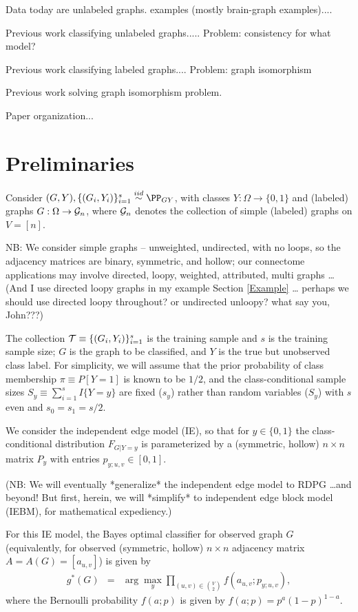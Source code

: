 Data today are unlabeled graphs.  examples (mostly brain-graph examples)....

Previous work classifying unlabeled graphs..... Problem: consistency for what model?

Previous work classifying labeled graphs.... Problem: graph isomorphism

Previous work solving graph isomorphism problem.

Paper organization...

\section{Preliminaries} %
\label{sec:preliminaries}



Consider $(G,Y),\{(G_i,Y_i)\}_{i=1}^s \overset{iid}{\sim} \PP_{GY}$,
with classes $Y:\Omega \rightarrow \{0,1\}$ and
(labeled) graphs $G:\Omega \rightarrow \mathcal{G}_n$,
where $\mathcal{G}_n$ denotes the collection of simple (labeled) graphs on $V=[n]$.

NB:
We consider simple graphs -- unweighted, undirected, with no loops,
so the adjacency matrices are binary, symmetric, and hollow;
our connectome applications
may involve {directed, loopy, weighted, attributed, multi} graphs \ldots
(And I use directed loopy graphs in my example Section \ref{Example} \dots
perhaps we should use directed loopy throughout? or undirected unloopy? what say you, John???)

The collection
$\mathcal{T} \equiv \{(G_i,Y_i)\}_{i=1}^s$ is the training sample
and $s$ is the training sample size;
$G$ is the graph to be classified,
and $Y$ is the true but unobserved class label.
For simplicity, we will assume that the prior probability of class membership
$\pi \equiv P[Y=1]$ is known to be $1/2$,
and the class-conditional sample sizes $S_y \equiv \sum_{i=1}^s I\{Y=y\}$
are fixed ($s_y$) rather than random variables ($S_y$)
with $s$ even and $s_0=s_1=s/2$.

We consider the independent edge model (IE),
so that for $y \in \{0,1\}$ the class-conditional distribution $F_{G|Y=y}$
is parameterized by a (symmetric, hollow)
$n \times n$ matrix $P_y$ with entries $p_{y;u,v} \in [0,1]$.

(NB: We will eventually *generalize* the independent edge model to RDPG \ldots and beyond!
But first, herein, we will *simplify* to independent edge block model (IEBM), for mathematical expediency.)

For this IE model, the Bayes optimal classifier for observed graph $G$
(equivalently, for observed (symmetric, hollow) $n \times n$ adjacency matrix $A=A(G)=[a_{u,v}]$)
is given by
\begin{eqnarray}
g^*(G) &=& \arg\max_y \prod_{(u,v) \in {V \choose 2}} f(a_{u,v};p_{y;u,v}),
\end{eqnarray}
where the Bernoulli probability $f(a;p)$ is given by
$f(a;p) = p^{a} (1-p)^{1-a}$.


